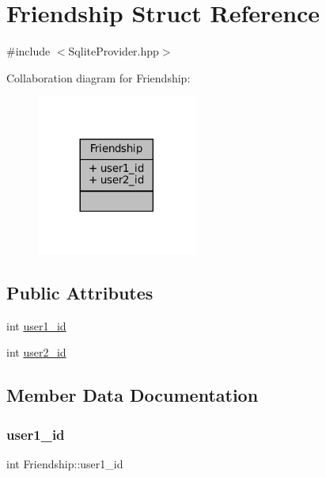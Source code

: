\hypertarget{structFriendship}{}\section{Friendship Struct Reference}
\label{structFriendship}


{\ttfamily \#include $<$Sqlite\+Provider.\+hpp$>$}



Collaboration diagram for Friendship\+:
\nopagebreak
\begin{figure}[H]
\begin{center}
\leavevmode
\includegraphics[width=149pt]{structFriendship__coll__graph}
\end{center}
\end{figure}
\subsection*{Public Attributes}
\begin{DoxyCompactItemize}
\item 
int \mbox{\hyperlink{structFriendship_a1b9f466250defc4657029df09bb2ca62}{user1\+\_\+id}}
\item 
int \mbox{\hyperlink{structFriendship_a673079868906404d4c283b682934e501}{user2\+\_\+id}}
\end{DoxyCompactItemize}


\subsection{Member Data Documentation}
\mbox{\label{structFriendship_a1b9f466250defc4657029df09bb2ca62}} 
\subsubsection{\texorpdfstring{user1\+\_\+id}{user1\_id}}
{\footnotesize\ttfamily int Friendship\+::user1\+\_\+id}

